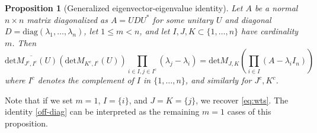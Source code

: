 \documentclass[12pt]{amsart}
\newtheorem{proposition}[lemma]{Proposition}
\begin{document}
\begin{proposition}[Generalized eigenvector-eigenvalue identity]  Let $A$ be a normal $n \times n$ matrix diagonalized as $A = UDU^*$ for some unitary $U$ and diagonal $D = \mathrm{diag}(\lambda_1,\dots,\lambda_n)$, let $1 \leq m < n$, and let $I,J,K \subset \{1,\dots,n\}$ have cardinality $m$.  Then
$$ \overline{\mathrm{det} M_{J^c,I^c}(U)} (\mathrm{det} M_{K^c,I^c}(U)) \prod_{i \in I, j \in I^c} (\lambda_j - \lambda_i) = \mathrm{det} M_{J,K}( \prod_{i \in I} (A - \lambda_i I_n) )$$
where $I^c$ denotes the complement of $I$ in $\{1,\dots,n\}$, and similarly for $J^c,K^c$.
\end{proposition}

Note that if we set $m=1$, $I = \{i\}$, and $J=K=\{j\}$, we recover \eqref{eq:wts}.  The identity \eqref{off-diag} can be interpreted as the remaining $m=1$ cases of this proposition.
\end{document}
